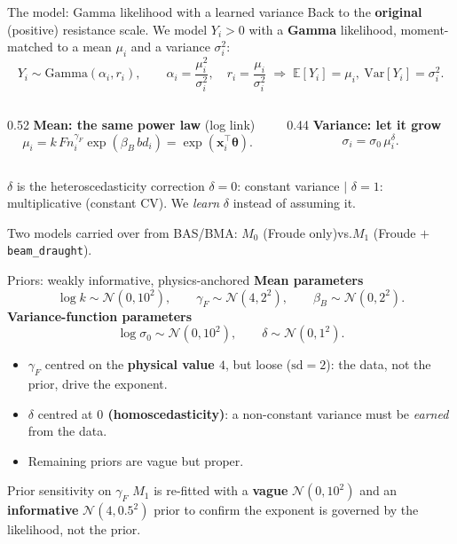 \documentclass[11pt,aspectratio=169]{beamer}
\newcommand{\Fn}{\ensuremath{F\!n}}
\begin{document}
\begin{frame}{The model: Gamma likelihood with a learned variance}
	\small
	Back to the \textbf{original} (positive) resistance scale. We model $Y_i>0$ with a
	\textbf{Gamma} likelihood, moment-matched to a mean $\mu_i$ and a variance $\sigma_i^2$:
	\[
		Y_i\sim\mathrm{Gamma}(\alpha_i,r_i),\qquad
		\alpha_i=\frac{\mu_i^2}{\sigma_i^2},\quad r_i=\frac{\mu_i}{\sigma_i^2}
		\;\Longrightarrow\; \mathbb{E}[Y_i]=\mu_i,\ \mathrm{Var}[Y_i]=\sigma_i^2.
	\]
	\begin{columns}[T]
		\begin{column}{0.52\textwidth}
			\textbf{Mean: the same power law} (log link)
			\[
				\mu_i=k\,\Fn_i^{\gamma_F}\exp(\beta_B\,bd_i)=\exp(\bm x_i^{\!\top}\bm\theta).
			\]
		\end{column}
		\begin{column}{0.44\textwidth}
			\textbf{Variance: let it grow}
			\[
				\sigma_i=\sigma_0\,\mu_i^{\delta}.
			\]
		\end{column}
	\end{columns}
	\vspace{0.2em}
	\begin{block}{$\delta$ is the heteroscedasticity correction}
		$\delta=0$: constant variance \;$\big|$\; $\delta=1$: multiplicative
		(constant CV). We \emph{learn} $\delta$ instead of assuming it.
	\end{block}
	Two models carried over from BAS/BMA:\quad
	$M_0$ (Froude only)\quad vs.\quad $M_1$ (Froude $+$ \texttt{beam\_draught}).
\end{frame}


\begin{frame}{Priors: weakly informative, physics-anchored}
	\small
	\textbf{Mean parameters}
	\[
		\log k\sim\mathcal{N}(0,10^2),\qquad
		\gamma_F\sim\mathcal{N}(4,2^2),\qquad
		\beta_B\sim\mathcal{N}(0,2^2).
	\]
	\textbf{Variance-function parameters}
	\[
		\log\sigma_0\sim\mathcal{N}(0,10^2),\qquad
		\delta\sim\mathcal{N}(0,1^2).
	\]
	\begin{itemize}
		\item $\gamma_F$ centred on the \textbf{physical value $4$}, but loose ($\mathrm{sd}=2$):
		      the data, not the prior, drive the exponent.
		\item $\delta$ centred at \textbf{$0$ (homoscedasticity)}: a non-constant variance
		      must be \emph{earned} from the data.
		\item Remaining priors are vague but proper.
	\end{itemize}
	\begin{block}{Prior sensitivity on $\gamma_F$}
		$M_1$ is re-fitted with a \textbf{vague} $\mathcal{N}(0,10^2)$ and an
		\textbf{informative} $\mathcal{N}(4,0.5^2)$ prior to confirm the exponent is
		governed by the likelihood, not the prior.
	\end{block}
\end{frame}
\end{document}
